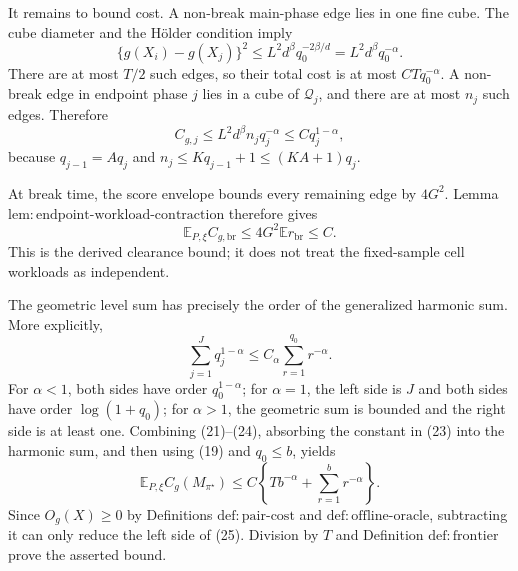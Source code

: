 It remains to bound cost.  A non-break main-phase edge lies in one fine cube.  The cube diameter and the H\"older condition imply
\[
 \{g(X_i)-g(X_j)\}^2
 \le L^2d^\beta q_0^{-2\beta/d}
 =L^2d^\beta q_0^{-\alpha}. \tag{21}
\]
There are at most \(T/2\) such edges, so their total cost is at most \(C Tq_0^{-\alpha}\).  A non-break edge in endpoint phase \(j\) lies in a cube of \(\mathcal Q_j\), and there are at most \(n_j\) such edges.  Therefore
\[
 C_{g,j}\le L^2d^\beta n_jq_j^{-\alpha}
 \le Cq_j^{1-\alpha}, \tag{22}
\]
because \(q_{j-1}=Aq_j\) and \(n_j\le Kq_{j-1}+1\le(KA+1)q_j\).

At break time, the score envelope bounds every remaining edge by \(4G^2\).  Lemma \(\mathrm{lem:endpoint\text{-}workload\text{-}contraction}\) therefore gives
\[
 \mathbb E_{P,\xi} C_{g,\mathrm{br}}
 \le4G^2\mathbb E r_{\mathrm{br}}\le C. \tag{23}
\]
This is the derived clearance bound; it does not treat the fixed-sample cell workloads as independent.

The geometric level sum has precisely the order of the generalized harmonic sum.  More explicitly,
\[
 \sum_{j=1}^Jq_j^{1-\alpha}
 \le C_\alpha\sum_{r=1}^{q_0}r^{-\alpha}. \tag{24}
\]
For \(\alpha<1\), both sides have order \(q_0^{1-\alpha}\); for \(\alpha=1\), the left side is \(J\) and both sides have order \(\log(1+q_0)\); for \(\alpha>1\), the geometric sum is bounded and the right side is at least one.  Combining (21)--(24), absorbing the constant in (23) into the harmonic sum, and then using (19) and \(q_0\le b\), yields
\[
 \mathbb E_{P,\xi}C_g(M_{\pi^\star})
 \le C\left\{Tb^{-\alpha}+\sum_{r=1}^b r^{-\alpha}\right\}. \tag{25}
\]
Since \(O_g(X)\ge0\) by Definitions \(\mathrm{def:pair\text{-}cost}\) and \(\mathrm{def:offline\text{-}oracle}\), subtracting it can only reduce the left side of (25).  Division by \(T\) and Definition \(\mathrm{def:frontier}\) prove the asserted bound.

